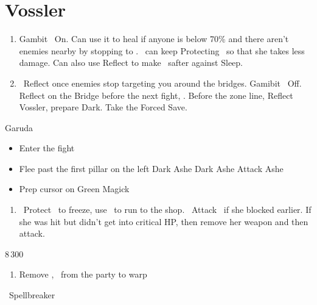 \chapter{Vossler}

\begin{enumerate}
	\item Gambit \ashe\ On. Can use it to heal if anyone is below 70\% and there aren't enemies nearby by stopping to \flee. \vaan\ can keep Protecting \penelo\ so that she takes less damage. Can also use Reflect to make \penelo\ safter against Sleep.
	\item \vaan\ Reflect \vaan once enemies stop targeting you around the bridges. Gamibit \ashe\ Off. Reflect on the Bridge before the next fight, \leader{\penelo}. Before the zone line, Reflect Vossler, prepare Dark. Take the Forced Save.
\end{enumerate}
\begin{battle}{Garuda}
	\begin{itemize}
		\penelof Dark \ashe, ensure that it lands
		\ashef Attack \penelo
		\penelof If not in critical, then Attack \penelo
		\item Enter the fight
		\item Flee past the first pillar on the left
		\penelof Dark Ashe
		\vaanf Dark Ashe
		\ashef Attack Ashe
		\item Prep cursor on Green Magick
	\end{itemize}
\end{battle}
\begin{enumerate}
\item \vaan\ Protect \vaan\ to freeze, use \penelo\ to run to the shop. \ashe\ Attack \ashe\ if she blocked earlier. If she was hit but didn't get into critical HP, then remove her weapon and then attack.
\end{enumerate}
\begin{shop}{8\,300}
\end{shop}
\begin{enumerate}
	\item Remove \ashe, \penelo\ from the party to warp
\end{enumerate}
\begin{liscense}
	\ashe\ Spellbreaker
\end{liscense}
\begin{gambit}
	\begin{itemize}
	\end{itemize}
\end{gambit}
